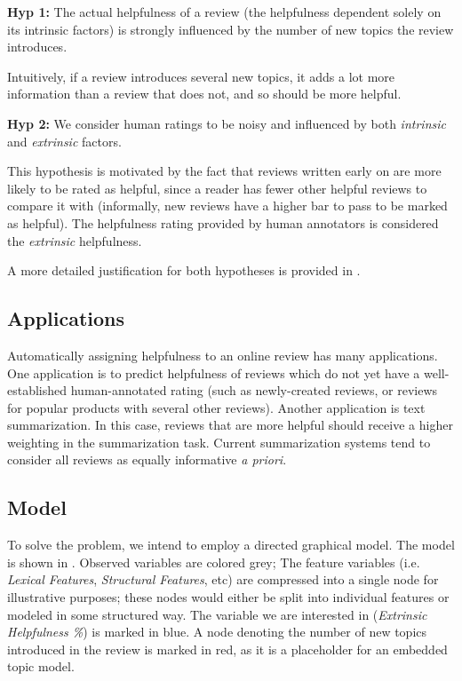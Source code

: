 \documentclass[letter,12pt]{article}
\begin{document}
{\bf Hyp 1:}  The actual helpfulness of a review (the helpfulness dependent solely on its intrinsic factors) is strongly influenced by the number of new topics the review introduces.

Intuitively, if a review introduces several new topics, it adds a lot more information than a review that does not, and so should be more helpful. 

{\bf Hyp 2:} We consider human ratings to be noisy and influenced by both {\em intrinsic} and {\em extrinsic} factors.

This hypothesis is motivated by the fact that reviews written early on are more likely to be rated as helpful, since a reader has fewer other helpful reviews to compare it with (informally, new reviews have a higher bar to pass to be marked as helpful).
The helpfulness rating provided by human annotators is considered the {\em extrinsic} helpfulness.

A more detailed justification for both hypotheses  is provided in .

\subsection{Applications}
Automatically assigning helpfulness to an online review has many applications. One application is to predict helpfulness of reviews which do not yet have a well-established human-annotated rating (such as newly-created reviews, or reviews for popular products with several other reviews).  Another application is text summarization. In this case, reviews that are more helpful should receive a higher weighting in the summarization task. Current summarization systems tend to consider all reviews as  equally informative {\em a priori}.

\subsection{Model}

To solve the problem, we intend to employ a directed graphical model.
The model is shown in .
Observed variables are colored grey;
The feature variables (i.e. {\em Lexical Features}, {\em Structural Features}, 
	etc) are compressed into a single node for illustrative purposes;
	these nodes would either be split into individual features or modeled
	in some structured way.
The variable we are interested in ({\em Extrinsic Helpfulness \%}) is marked
	in blue.
A node denoting the number of new topics introduced in the review is marked
	in red, as it is a placeholder for an embedded topic model.
\end{document}
